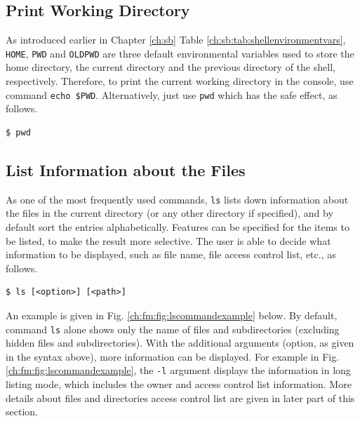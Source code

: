 \subsection{Print Working Directory}

As introduced earlier in Chapter \ref{ch:sb} Table \ref{ch:sb:tab:shellenvironmentvars}, \verb|HOME|, \verb|PWD| and \verb|OLDPWD| are three default environmental variables used to store the home directory, the current directory and the previous directory of the shell, respectively. Therefore, to print the current working directory in the console, use command \verb|echo $PWD|. Alternatively, just use \verb|pwd| which has the safe effect, as follows.

\begin{lstlisting}
$ pwd
\end{lstlisting}

\subsection{List Information about the Files}

As one of the most frequently used commands, \verb|ls| lists down information about the files in the current directory (or any other directory if specified), and by default sort the entries alphabetically. Features can be specified for the items to be listed, to make the result more selective. The user is able to decide what information to be displayed, such as file name, file access control list, etc., as follows.
\begin{lstlisting}
$ ls [<option>] [<path>]
\end{lstlisting}

An example is given in Fig. \ref{ch:fm:fig:lscommandexample} below. By default, command \verb|ls| alone shows only the name of files and subdirectories (excluding hidden files and subdirectories). With the additional arguments (option, as given in the syntax above), more information can be displayed. For example in Fig. \ref{ch:fm:fig:lscommandexample}, the \verb|-l| argument displays the information in long listing mode, which includes the owner and access control list information. More details about files and directories access control list are given in later part of this section.

